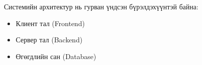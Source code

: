 Системийн архитектур нь гурван үндсэн бүрэлдэхүүнтэй байна:
\begin{itemize}
    \item Клиент тал (Frontend)
    \item Сервер тал (Backend)
    \item Өгөгдлийн сан (Database)
\end{itemize}
